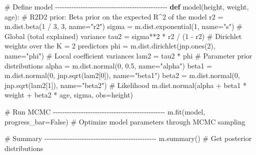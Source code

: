 \documentclass[
  letterpaper,
  DIV=11,
  numbers=noendperiod]{scrartcl}
\newenvironment{Shaded}{\begin{snugshade}}{\end{snugshade}}
\newcommand{\CommentTok}[1]{\textcolor[rgb]{0.37,0.37,0.37}{#1}}
\newcommand{\DecValTok}[1]{\textcolor[rgb]{0.68,0.00,0.00}{#1}}
\newcommand{\FloatTok}[1]{\textcolor[rgb]{0.68,0.00,0.00}{#1}}
\newcommand{\KeywordTok}[1]{\textcolor[rgb]{0.00,0.23,0.31}{\textbf{#1}}}
\newcommand{\NormalTok}[1]{\textcolor[rgb]{0.00,0.23,0.31}{#1}}
\newcommand{\OperatorTok}[1]{\textcolor[rgb]{0.37,0.37,0.37}{#1}}
\newcommand{\StringTok}[1]{\textcolor[rgb]{0.13,0.47,0.30}{#1}}
\newcommand{\VariableTok}[1]{\textcolor[rgb]{0.07,0.07,0.07}{#1}}
\begin{document}
\begin{Shaded}
\begin{Highlighting}[]
\CommentTok{\# Define model {-}{-}{-}{-}{-}{-}{-}{-}{-}{-}{-}{-}{-}{-}{-}{-}{-}{-}{-}{-}{-}{-}{-}{-}{-}{-}{-}{-}{-}{-}{-}{-}{-}{-}{-}{-}{-}{-}{-}{-}{-}{-}{-}{-}{-}{-}{-}{-}}
\KeywordTok{def}\NormalTok{ model(height, weight, age):}
    \CommentTok{\# R2D2 prior: Beta prior on the expected R\^{}2 of the model}
\NormalTok{    r2 }\OperatorTok{=}\NormalTok{ m.dist.beta(}\DecValTok{1} \OperatorTok{/} \DecValTok{3}\NormalTok{, }\DecValTok{3}\NormalTok{, name}\OperatorTok{=}\StringTok{"r2"}\NormalTok{)}
\NormalTok{    sigma }\OperatorTok{=}\NormalTok{ m.dist.exponential(}\DecValTok{1}\NormalTok{, name}\OperatorTok{=}\StringTok{"s"}\NormalTok{)}
    \CommentTok{\# Global (total explained) variance}
\NormalTok{    tau2 }\OperatorTok{=}\NormalTok{ sigma}\OperatorTok{**}\DecValTok{2} \OperatorTok{*}\NormalTok{ r2 }\OperatorTok{/}\NormalTok{ (}\DecValTok{1} \OperatorTok{{-}}\NormalTok{ r2)}
    \CommentTok{\# Dirichlet weights over the K = 2 predictors}
\NormalTok{    phi }\OperatorTok{=}\NormalTok{ m.dist.dirichlet(jnp.ones(}\DecValTok{2}\NormalTok{), name}\OperatorTok{=}\StringTok{"phi"}\NormalTok{)}
    \CommentTok{\# Local coefficient variances}
\NormalTok{    lam2 }\OperatorTok{=}\NormalTok{ tau2 }\OperatorTok{*}\NormalTok{ phi}
    \CommentTok{\# Parameter prior distributions}
\NormalTok{    alpha }\OperatorTok{=}\NormalTok{ m.dist.normal(}\DecValTok{0}\NormalTok{, }\FloatTok{0.5}\NormalTok{, name}\OperatorTok{=}\StringTok{"alpha"}\NormalTok{)}
\NormalTok{    beta1 }\OperatorTok{=}\NormalTok{ m.dist.normal(}\DecValTok{0}\NormalTok{, jnp.sqrt(lam2[}\DecValTok{0}\NormalTok{]), name}\OperatorTok{=}\StringTok{"beta1"}\NormalTok{)}
\NormalTok{    beta2 }\OperatorTok{=}\NormalTok{ m.dist.normal(}\DecValTok{0}\NormalTok{, jnp.sqrt(lam2[}\DecValTok{1}\NormalTok{]), name}\OperatorTok{=}\StringTok{"beta2"}\NormalTok{)}
    \CommentTok{\# Likelihood}
\NormalTok{    m.dist.normal(alpha }\OperatorTok{+}\NormalTok{ beta1 }\OperatorTok{*}\NormalTok{ weight }\OperatorTok{+}\NormalTok{ beta2 }\OperatorTok{*}\NormalTok{ age, sigma, obs}\OperatorTok{=}\NormalTok{height)}

\CommentTok{\# Run MCMC {-}{-}{-}{-}{-}{-}{-}{-}{-}{-}{-}{-}{-}{-}{-}{-}{-}{-}{-}{-}{-}{-}{-}{-}{-}{-}{-}{-}{-}{-}{-}{-}{-}{-}{-}{-}{-}{-}{-}{-}{-}{-}{-}{-}{-}{-}{-}{-}}
\NormalTok{m.fit(model, progress\_bar}\OperatorTok{=}\VariableTok{False}\NormalTok{)  }\CommentTok{\# Optimize model parameters through MCMC sampling}

\CommentTok{\# Summary {-}{-}{-}{-}{-}{-}{-}{-}{-}{-}{-}{-}{-}{-}{-}{-}{-}{-}{-}{-}{-}{-}{-}{-}{-}{-}{-}{-}{-}{-}{-}{-}{-}{-}{-}{-}{-}{-}{-}{-}{-}{-}{-}{-}{-}{-}{-}{-}}
\NormalTok{m.summary()  }\CommentTok{\# Get posterior distributions}
\end{Highlighting}
\end{Shaded}
\end{document}
